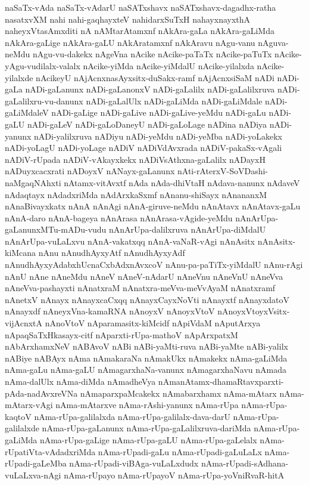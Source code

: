 {naSaTx-vAda
naSaTx-vAdarU
naSATxshavx
naSATxshavx-dagadhx-ratha
nasatxvXM
nahi
nahi-gaqhayxteV
nahidarxSuTxH
nahayxnayxthA
naheyxVtasAmxditi
nA
nAMtarAtamxnf
nAkAra-gaLa
nAkAra-gaLiMda
nAkAra-gaLige
nAkAra-gaLU
nAkAratamxnf
nAkAravu
nAgu-vanu
nAguva-neMdu
nAgu-vu-dakekx
nAgeVna
nAcike
nAcike-paTaTx
nAcike-paTuTx
nAcike-yAgu-vudilalx-valalx
nAcike-yiMda
nAcike-yiMdalU
nAcike-yilalxda
nAcike-yilalxde
nAcikeyU
nAjAcnxnasAyxsitx-duSakx-ramf
nAjAcnxsiSaM
nADi
nADi-gaLa
nADi-gaLanunx
nADi-gaLanonxV
nADi-gaLalilx
nADi-gaLalilxruva
nADi-gaLalilxru-vu-danunx
nADi-gaLalUlx
nADi-gaLiMda
nADi-gaLiMdale
nADi-gaLiMdaleV
nADi-gaLige
nADi-gaLive
nADi-gaLive-yeMdu
nADi-gaLu
nADi-gaLU
nADi-gaLeV
nADi-gaLoDaneyU
nADi-gaLoLage
nADina
nADiya
nADi-yanunx
nADi-yalilxruva
nADiyu
nADi-yeMdu
nADi-yeMba
nADi-yoLakekx
nADi-yoLagU
nADi-yoLage
nADiV
nADiVdAvxrada
nADiV-pakaSx-vAgali
nADiV-rUpada
nADiV-vAkayxkekx
nADiVsAthxna-gaLalilx
nADayxH
nADuyxcacxrati
nADoyxV
nANayx-gaLanunx
nAti-rAterxV-SoVDashi-naMgaqNAhxti
nAtamx-vitAvxtf
nAda
nAda-dhiVtaH
nAdava-nanunx
nAdaveV
nAdaqtayx
nAdadxriMda
nAdArxkaSxmf
nAnanu-shiSayx
nAnananxM
nAnaBivayxkatx
nAnA
nAnAgi
nAnA-giruve-neMdu
nAnAtavx
nAnAtavx-gaLu
nAnA-daro
nAnA-bageya
nAnArasa
nAnArasa-vAgide-yeMdu
nAnArUpa-gaLanunxMTu-mADu-vudu
nAnArUpa-dalilxruva
nAnArUpa-diMdalU
nAnArUpa-vuLaLxvu
nAnA-vakatxqq
nAnA-vaNaR-vAgi
nAnAsitx
nAnAsitx-kiMcana
nAnu
nAnudhAyxyAtf
nAnudhAyxyAdf
nAnudhAyxyAdabxhUcnaCxbAdxnAvxcoV
nAnu-pa-paTiTx-yiMdalU
nAnu-rAgi
nAnU
nAne
nAneMdu
nAneV
nAneV-nAdarU
nAneVnu
nAneVnU
nAneVva
nAneVva-pashayxti
nAnatxraM
nAnatxra-meVva-meVvAyaM
nAnatxramf
nAnetxV
nAnayx
nAnayxcaCxqq
nAnayxCayxNoVti
nAnayxtf
nAnayxdatoV
nAnayxdf
nAneyxVna-kamaRNA
nAnoyxV
nAnoyxVtoV
nAnoyxVtoyxVsitx-vijAcnxtA
nAnoVtoV
nAparamasitx-kiMcidf
nApiVdaM
nAputArxya
nApaqSaTxHkasayx-citf
nAparxti-rUpa-mathoV
nApArxpatxM
nAbArxhamxNeV
nABAvoV
nABi
nABi-yaMti-ruva
nABi-yaMte
nABi-yalilx
nABiye
nABAyx
nAma
nAmakaraNa
nAmakUkx
nAmakekx
nAma-gaLiMda
nAma-gaLu
nAma-gaLU
nAmagarxhaNa-vanunx
nAmagarxhaNavu
nAmada
nAma-dalUlx
nAma-diMda
nAmadheVya
nAmanAtamx-dhamaRtavxparxti-pAda-nadAvxreVNa
nAmaparxpaMcakekx
nAmabarxhamx
nAma-mAtarx
nAma-mAtarx-vAgi
nAma-mAtarxve
nAma-rAshi-yanunx
nAma-rUpa
nAma-rUpa-kaqtoV
nAma-rUpa-galilalxda
nAma-rUpa-galilalx-dava-darU
nAma-rUpa-galilalxde
nAma-rUpa-gaLanunx
nAma-rUpa-gaLalilxruva-dariMda
nAma-rUpa-gaLiMda
nAma-rUpa-gaLige
nAma-rUpa-gaLU
nAma-rUpa-gaLelalx
nAma-rUpatiVta-vAdadxriMda
nAma-rUpadi-gaLu
nAma-rUpadi-gaLuLaLx
nAma-rUpadi-gaLeMba
nAma-rUpadi-viBAga-vuLaLxdudx
nAma-rUpadi-sAdhana-vuLaLxva-nAgi
nAma-rUpayo
nAma-rUpayoV
nAma-rUpa-yoVniRvaR-hitA
}
